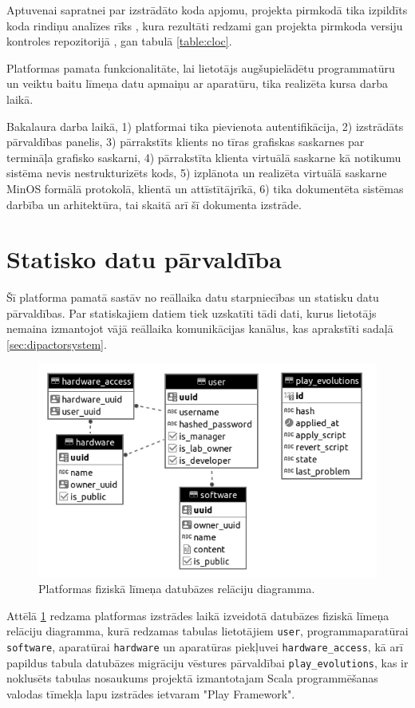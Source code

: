 Aptuvenai sapratnei par izstrādāto koda apjomu, projekta pirmkodā tika izpildīts
koda rindiņu analīzes rīks \cite{AlDanialCloc}, kura rezultāti redzami gan projekta
pirmkoda versiju kontroles repozitorijā \cite{VeinbahsKrisjanisTestbed}, gan tabulā
\ref{table:cloc}.

Platformas pamata funkcionalitāte, lai lietotājs augšupielādētu programmatūru un
veiktu baitu līmeņa datu apmaiņu ar aparatūru, tika realizēta kursa darba laikā.

Bakalaura darba laikā, 1) platformai tika pievienota autentifikācija, 2)
izstrādāts pārvaldības panelis, 3) pārrakstīts klients no tīras grafiskas
saskarnes par termināļa grafisko saskarni, 4) pārrakstīta klienta virtuālā
saskarne kā notikumu sistēma nevis nestrukturizēts kods, 5) izplānota un
realizēta virtuālā saskarne MinOS formālā protokolā, klientā un attīstītājrīkā,
6) tika dokumentēta sistēmas darbība un arhitektūra, tai skaitā arī šī dokumenta
izstrāde.

\section{Statisko datu pārvaldība}
\label{sec:staticdata}

Šī platforma pamatā sastāv no reāllaika datu starpniecības un statisku datu
pārvaldības. Par statiskajiem datiem tiek uzskatīti tādi dati, kurus lietotājs
nemaina izmantojot vājā reāllaika komunikācijas kanālus, kas aprakstīti sadaļā
\ref{sec:dipactorsystem}. 

\begin{figure}[H]
    \includegraphics[width=0.7\linewidth]{assets/physical-er-diagram-gray.png}
    \centering
    \caption{Platformas fiziskā līmeņa datubāzes relāciju diagramma.}
    \label{fig:staticdata}
\end{figure}

Attēlā \ref{fig:staticdata} redzama platformas izstrādes laikā izveidotā
datubāzes fiziskā līmeņa relāciju diagramma, kurā redzamas tabulas lietotājiem
\lstinline!user!, programmaparatūrai \lstinline!software!, aparatūrai
\lstinline!hardware! un aparatūras piekļuvei \lstinline!hardware_access!, kā arī
papildus tabula datubāzes migrāciju vēstures pārvaldībai
\lstinline!play_evolutions!, kas ir noklusēts tabulas nosaukums projektā
izmantotajam Scala programmēšanas valodas tīmekļa lapu izstrādes ietvaram "Play
Framework".

